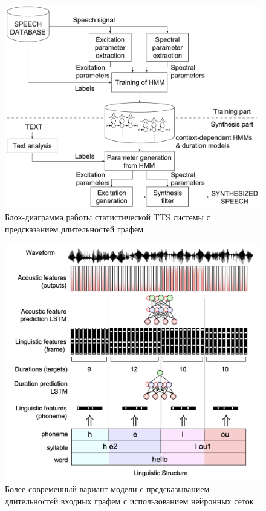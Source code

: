 \begin{figure}[!ht]
\centering
\includegraphics[width=1.0\textwidth]{images/related-work/stats-tts.png}
\caption{Блок-диаграмма работы статистической TTS системы с предсказанием длительностей графем~\cite{zen2009}}
\label{fig:stats-tts}
\end{figure}

\begin{figure}[!ht]
\centering
\includegraphics[width=1.0\textwidth]{images/related-work/zen-tts.png}
\caption{Более современный вариант модели с предсказыванием длительностей входных графем с использованием нейронных сеток~\cite{zen-2015,zen-2016}}
\label{fig:zen-tts}
\end{figure}

